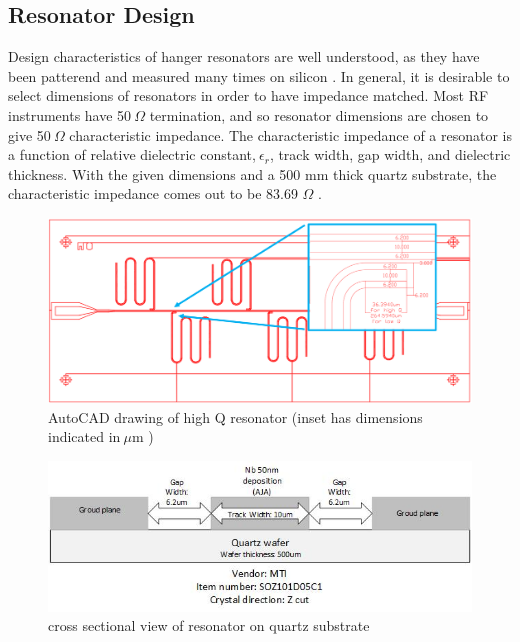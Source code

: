 \documentclass[11pt]{article}
\numberwithin{equation}{section}
\begin{document}
\subsection{Resonator Design}

\hspace{\parindent}
Design characteristics of hanger resonators are well understood, as they have been patterend and measured many times on silicon \cite{mazin}. 
In general, it is desirable to select dimensions of resonators in order to have impedance matched.  Most RF instruments have 50\(\ \Omega \) termination, and so resonator dimensions are chosen to give 50\(\ \Omega \) characteristic impedance.  The characteristic impedance of a resonator is a function of relative dielectric constant,\(\ \epsilon_{r} \), track width, gap width, and dielectric thickness.   With the given dimensions and a 500 mm thick quartz substrate, the characteristic impedance comes out to be 83.69 \(\Omega \)  \cite{marsrover}.  \\

\begin{figure}
	\centering
	\includegraphics[scale=0.5] {Drawing1}
	\caption{AutoCAD drawing of high Q resonator (inset has dimensions indicated in\(\ \mu \)m )}
	\label{doublelacircuit}
\end{figure}

\begin{figure}
	\centering
	\includegraphics[scale=0.7] {crosssectional}
	\caption{cross sectional view of resonator on quartz substrate}
	\label{crosssectional}
\end{figure}
\end{document}
